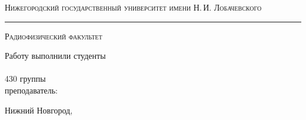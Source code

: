 \begin{titlepage}

\begin{center}

	\textsc{Нижегородский государственный университет имени Н.\,И. Лобачевского}
	\vskip 4pt \hrule \vskip 8pt
	\textsc{Радиофизический факультет}

	\vfill

	{\Large\labname}

\end{center}

\vfill

\begin{flushright}
	{Работу выполнили студенты\\ \authors\\ 430 группы\\ \vskip 14pt преподаватель:\\ \sciadviser}
\end{flushright}

\vfill

\begin{center}
	Нижний Новгород, \the\year
\end{center}

\end{titlepage}